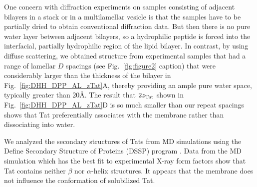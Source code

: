 One concern with diffraction experiments on samples consisting of adjacent 
bilayers in a stack or in a multilamellar vesicle is that the samples have 
to be partially dried to obtain conventional diffraction data. But then there 
is no pure water layer between adjacent bilayers, so a hydrophilic peptide is 
forced into the interfacial, partially hydrophilic region of the lipid
bilayer. In contrast, by using diffuse scattering, we obtained structure from 
experimental samples that had a range of lamellar $D$ spacings 
(see Fig.~\ref{fig:figure2} caption) that were considerably
larger than the thickness of the bilayer in 
Fig.~\ref{fig:DHH_DPP_AL_zTat}A, thereby providing an ample pure water space,
typically greater than 20\AA. The result that $2z_\textrm{Tat}$ shown in 
Fig.~\ref{fig:DHH_DPP_AL_zTat}D is so much smaller than our
repeat spacings shows that Tat preferentially associates with the membrane 
rather than dissociating into water.

We analyzed the secondary structures of Tats from MD simulations using the 
Define Secondary Structure of Proteins (DSSP) program \cite{Kabsch83}. Data 
from the MD simulation which has the best fit to experimental X-ray form 
factors show that Tat contains neither $\beta$ nor $\alpha$-helix structures.
It appears that the membrane does not influence the conformation of solubilized 
Tat. 

